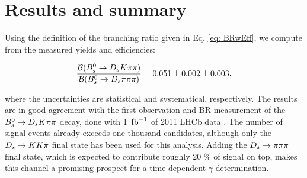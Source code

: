 \section{Results and summary}
\label{sec: results}

Using the definition of the branching ratio given in Eq. \ref{eq: BRwEff}, we compute from the measured yields and efficiencies:

\begin{equation}
\frac{\mathcal{B}({{B}^0_{s}}\rightarrow{\ensuremath{{D}_{s}}}{\ensuremath{K}}{\ensuremath{\pi}}{\ensuremath{\pi}})}{\mathcal{B}({{B}^0_{s}}\rightarrow{\ensuremath{{D}_{s}}}{\ensuremath{\pi}}{\ensuremath{\pi}}{\ensuremath{\pi}})} = 0.051 \pm 0.002 \pm 0.003,
\label{eq: resultBR}
\end{equation}

where the uncertainties are statistical and systematical, respectively. \newline
The results are in good agreement with the first observation and BR measurement of the ${{B}^0_{s}}\rightarrow{\ensuremath{{D}_{s}}}{\ensuremath{K}}{\ensuremath{\pi}}{\ensuremath{\pi}}$ decay, done with 1 $\mbox{\,fb}^{-1}$ of 2011 LHCb data \cite{Blusk:2012it}.  
The number of signal events already exceeds one thousand candidates, although only the ${{D}_{s}}\rightarrow{\ensuremath{K}}{\ensuremath{K}}{\ensuremath{\pi}}$ final state has been used for this analysis. 
Adding the ${{D}_{s}}\rightarrow{\ensuremath{\pi}}{\ensuremath{\pi}}{\ensuremath{\pi}}$ final state, which is expected to contribute roughly 20 $\%$ of signal on top, makes this channel a promising prospect for a time-dependent $\gamma$ determination.

